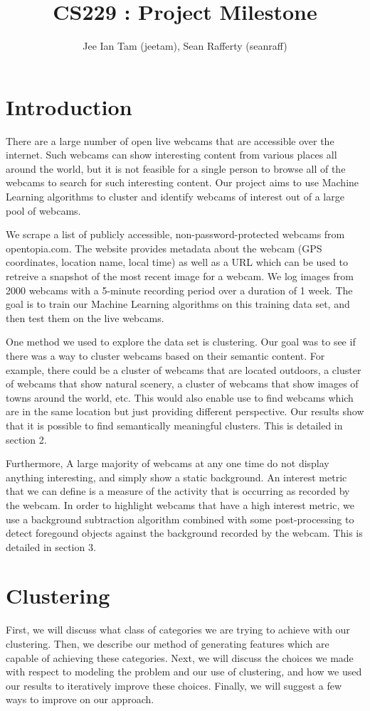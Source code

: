 \documentclass{article}
\begin{document}
\title{CS229 : Project Milestone}
\author{Jee Ian Tam (jeetam), Sean Rafferty (seanraff)}

\section{Introduction}
There are a large number of open live webcams that are accessible over the
internet. Such webcams can show interesting content from various places all
around the world, but it is not feasible for a single person to browse all of
the webcams to search for such interesting content. Our project aims to use
Machine Learning algorithms to cluster and identify webcams of interest out of
a large pool of webcams.

We scrape a list of publicly accessible, non-password-protected webcams from
opentopia.com. The website provides metadata about the webcam (GPS coordinates,
location name, local time) as well as a URL which can be used to retreive a
snapshot of the most recent image for a webcam. We log images from 2000 webcams
with a 5-minute recording period over a duration of 1 week. The goal is to
train our Machine Learning algorithms on this training data set, and then test
them on the live webcams.

One method we used to explore the data set is clustering. Our goal was to see
if there was a way to cluster webcams based on their semantic content.  For
example, there could be a cluster of webcams that are located outdoors, a
cluster of webcams that show natural scenery, a cluster of webcams that show
images of towns around the world, etc. This would also enable use to find
webcams which are in the same location but just providing different
perspective. Our results show that it is possible to find semantically
meaningful clusters. This is detailed in section 2.

Furthermore, A large majority of webcams at any one time do not display anything
interesting, and simply show a static background. An interest metric that we
can define is a measure of the activity that is occurring as recorded by the
webcam. In order to highlight webcams that have a high interest metric, we use
a background subtraction algorithm combined with some post-processing to detect
foregound objects against the background recorded by the webcam. This is
detailed in section 3.


\section{Clustering}
First, we will discuss what class of categories we are trying to achieve with
our clustering. Then, we describe our method of generating features which are
capable of achieving these categories. Next, we will discuss the choices we
made with respect to modeling the problem and our use of clustering, and how we
used our results to iteratively improve these choices. Finally, we will suggest
a few ways to improve on our approach.
\end{document}
